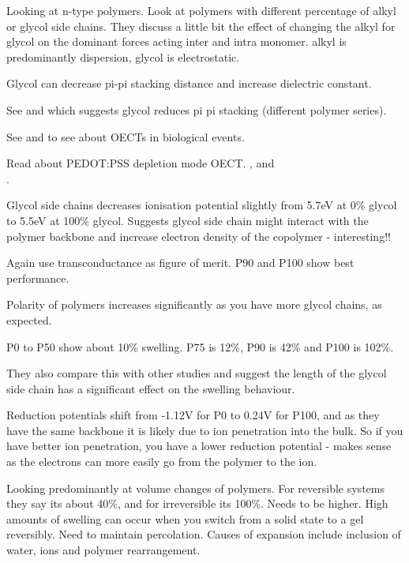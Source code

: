 \documentclass{article}
\begin{document}
Looking at n-type polymers.  Look at polymers with different percentage of alkyl or glycol side chains.   They discuss a little bit the effect of changing the alkyl for glycol on the dominant forces acting inter and intra monomer. alkyl is predominantly dispersion,  glycol is electrostatic.

Glycol can decrease pi-pi stacking distance and increase dielectric constant. 

See \cite{Chen2016} and \cite{Meng2015} which suggests glycol reduces pi pi stacking (different polymer series).  

See \cite{Strakosas2015} and \cite{Rivnay2018} to see about OECTs in biological events.  

Read about PEDOT:PSS depletion mode OECT.  \cite{Khodagholy2013}, \cite{Khodagholy2013a} and \\\cite{Campana2014}.  

Glycol side chains decreases ionisation potential slightly from 5.7eV at 0\% glycol to 5.5eV at 100\% glycol. Suggests glycol side chain might interact with the polymer backbone and increase electron density of the copolymer - interesting!!

Again use transconductance as figure of merit. P90 and P100 show best performance.  

Polarity of polymers increases significantly as you have more glycol chains, as expected. 

P0 to P50 show about 10\% swelling. P75 is 12\%, P90 is 42\% and P100 is 102\%.  

They also compare this with other studies and suggest the length of the glycol side chain has a significant effect on the swelling behaviour.  

Reduction potentials shift from -1.12V for P0 to 0.24V for P100, and as they have the same backbone it is likely due to ion penetration into the bulk.  So if you have better ion penetration, you have a lower reduction potential - makes sense as the electrons can more easily go from the polymer to the ion.





 \vspace{1cm}
{\bf \cite{Gladisch2019}}  

 Looking predominantly at volume changes of polymers.  For reversible systems they say its about 40\%, and for irreversible its 100\%.  Needs to be higher.  High amounts of swelling can occur when you switch from a solid state to a gel reversibly.  Need to maintain percolation.  Causes of expansion include inclusion of water, ions and polymer rearrangement. 
\end{document}
